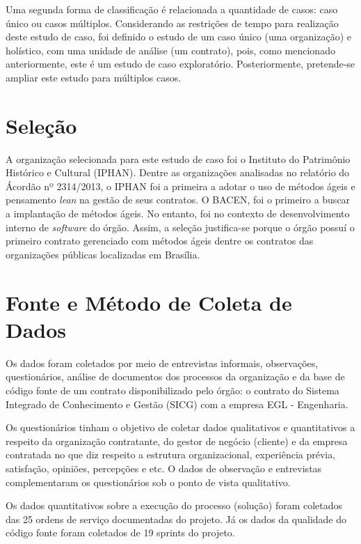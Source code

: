Uma segunda forma de classificação é relacionada a quantidade de casos: caso único ou casos múltiplos. Considerando as restrições de tempo para realização deste estudo de caso, foi definido o estudo de um caso único (uma organização) e holístico, com uma unidade de análise (um contrato), pois, como mencionado anteriormente, este é um estudo de caso exploratório. Posteriormente, pretende-se ampliar este estudo para múltiplos casos.   

\section[Seleção]{Seleção}

A organização selecionada para este estudo de caso foi o Instituto do Patrimônio Histórico e Cultural (IPHAN). Dentre as organizações analisadas no relatório do Ácordão nº 2314/2013, o IPHAN foi a primeira a adotar o uso de métodos ágeis e pensamento \textit{lean} na gestão de seus contratos. O BACEN, foi o primeiro a buscar a implantação de métodos ágeis. No entanto, foi no contexto de desenvolvimento interno de \textit{software} do órgão. Assim, a seleção justifica-se porque o órgão possuí o primeiro contrato gerenciado com métodos ágeis dentre os contratos das organizações públicas localizadas em Brasília.

\section[Fonte e Método Coleta de Dados]{Fonte e Método de Coleta de Dados}

Os dados foram coletados por meio de entrevistas informais, observações, questionários, análise de documentos dos processos da organização e da base de código fonte de um contrato disponibilizado pelo órgão: o contrato do Sistema Integrado de Conhecimento e Gestão (SICG) com a empresa EGL - Engenharia.

Os questionários tinham o objetivo de coletar dados qualitativos e quantitativos a respeito da organização contratante, do gestor de negócio (cliente) e da empresa contratada no que diz respeito a estrutura organizacional, experiência prévia, satisfação, opiniões, percepções e etc. O dados de observação e entrevistas complementaram os questionários sob o ponto de vista qualitativo.

Os dados quantitativos sobre a execução do processo (solução) foram coletados das 25 ordens de serviço documentadas do projeto. Já os dados da qualidade do código fonte foram coletados de 19 sprints do projeto.

